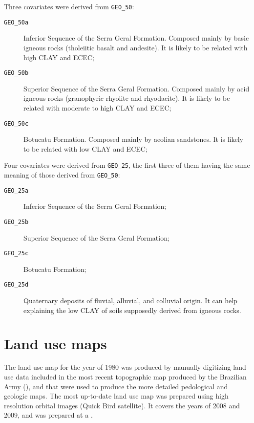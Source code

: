Three covariates were derived from \texttt{GEO\_50}:

\begin{description}
 \item[\texttt{GEO\_50a}] Inferior Sequence of the Serra Geral Formation. Composed mainly by basic 
 igneous rocks (tholeiitic basalt and andesite). It is likely to be related with high CLAY and 
 ECEC;
 
 \item[\texttt{GEO\_50b}] Superior Sequence of the Serra Geral Formation. Composed mainly by acid 
 igneous rocks (granophyric rhyolite and rhyodacite). It is likely to be related with moderate to 
 high CLAY and ECEC;
 
 \item[\texttt{GEO\_50c}] Botucatu Formation. Composed mainly by aeolian sandstones. It is likely 
 to be related with low CLAY and ECEC;
\end{description}

Four covariates were derived from \texttt{GEO\_25}, the first three of them having the same meaning 
of those derived from \texttt{GEO\_50}:

\begin{description}
 \item[\texttt{GEO\_25a}] Inferior Sequence of the Serra Geral Formation;
 
 \item[\texttt{GEO\_25b}] Superior Sequence of the Serra Geral Formation;
 
 \item[\texttt{GEO\_25c}] Botucatu Formation;
 
 \item[\texttt{GEO\_25d}] Quaternary deposits of fluvial, alluvial, and colluvial 
 origin. It can help explaining the low CLAY of soils supposedly derived from igneous rocks.
\end{description}

\tocless\section{Land use maps}
\label{sec:covar-data-land-use}

The land use map for the year of \num{1980} was produced by manually digitizing land use data included in the most 
recent topographic map produced by the Brazilian Army (), and that were used to produce the more detailed 
pedological and geologic maps. The most up-to-date land use map was prepared using high resolution orbital images
(Quick Bird satellite). It covers the years of \num{2008} and \num{2009}, and was prepared at a  
\cite{SamuelRosaEtAl2011a}.

